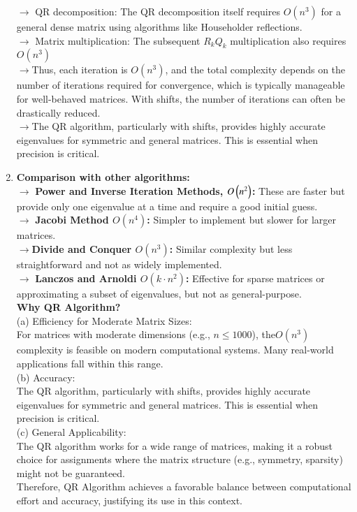 \documentclass[journal]{IEEEtran}
\begin{document}
\begin{enumerate}
    $\rightarrow$ QR decomposition: The QR decomposition itself requires $O(n^3)$ for a general dense matrix using algorithms like Householder reflections.\\
    $\rightarrow$ Matrix multiplication: The subsequent $R_kQ_k$ multiplication also requires $O(n^3)$\\ 
    
$\rightarrow$Thus, each iteration is $O(n^3)$, and the total complexity depends on the number of iterations required for convergence, which is typically manageable for well-behaved matrices. With shifts, the number of iterations can often be drastically reduced.\\
$\rightarrow$The QR algorithm, particularly with shifts, provides highly accurate eigenvalues for symmetric and general matrices. This is essential when precision is critical.
\item \textbf{Comparison with other algorithms:}\\
$\rightarrow$ \textbf{Power and Inverse Iteration Methods, $O\left(n^2\right)$:} These are faster but provide only one eigenvalue at a time and require a good initial guess.\\
$\rightarrow$ \textbf{Jacobi Method $O(n^4)$:} Simpler to implement but slower for larger matrices.\\
$\rightarrow$\textbf{Divide and Conquer $O(n^3)$:} Similar complexity but less straightforward and not as widely implemented.\\
$\rightarrow$ \textbf{Lanczos and Arnoldi $O(k\cdot n^2)$:} Effective for sparse matrices or approximating a subset of eigenvalues, but not as general-purpose.\\
\textbf{Why QR Algorithm?}\\
(a) Efficiency for Moderate Matrix Sizes:\\
For matrices with moderate dimensions (e.g., $n\leq1000$), the$O(n^3)$ complexity is feasible on modern computational systems. Many real-world applications fall within this range.\\

(b) Accuracy:\\
The QR algorithm, particularly with shifts, provides highly accurate eigenvalues for symmetric and general matrices. This is essential when precision is critical.\\

(c) General Applicability:\\
The QR algorithm works for a wide range of matrices, making it a robust choice for assignments where the matrix structure (e.g., symmetry, sparsity) might not be guaranteed.\\

Therefore, QR Algorithm achieves a favorable balance between computational effort and accuracy, justifying its use in this context.
\end{enumerate}
\end{document}
